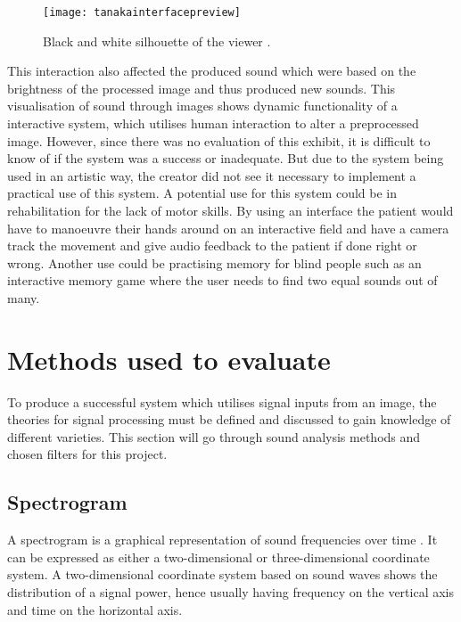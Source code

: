 \begin{figure}[!h]
\centering
\texttt{[image: tanakainterfacepreview]}
\caption{\label{fig:tanakainterfacepreview}Black and white silhouette of the viewer \cite{Tanaka2012}.}
\end{figure}

This interaction also affected the produced sound which were based on the brightness of the processed image and thus produced new sounds. This visualisation of sound through images shows dynamic functionality of a interactive system, which utilises human interaction to alter a preprocessed image. However, since there was no evaluation of this exhibit, it is difficult to know of if the system was a success or inadequate. But due to the system being used in an artistic way, the creator did not see it necessary to implement a practical use of this system. A potential use for this system could be in rehabilitation for the lack of motor skills. By using an interface the patient would have to manoeuvre their hands around on an interactive field and have a camera track the movement and give audio feedback to the patient if done right or wrong. Another use could be practising memory for blind people such as an interactive memory game where the user needs to find two equal sounds out of many. 

\section{Methods used to evaluate}\label{sec:methodsusedtoevaluate}

To produce a successful system which utilises signal inputs from an image, the theories for signal processing must be defined and discussed to gain knowledge of different varieties. This section will go through sound analysis methods and chosen filters for this project. 

\subsection{Spectrogram}\label{sub:spectrogram}

A spectrogram is a graphical representation of sound frequencies over time \cite{Izotope2014}. It can be expressed as either a two-dimensional or three-dimensional coordinate system. A two-dimensional coordinate system based on sound waves shows the distribution of a signal power, hence usually having frequency on the vertical axis and time on the horizontal axis.

